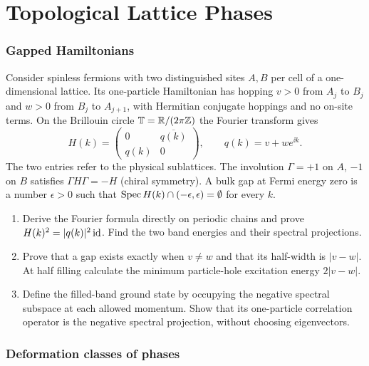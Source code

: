 \part{Topological Lattice Phases}

\section{Gapped Hamiltonians}

\begin{exercise}
Consider spinless fermions with two distinguished sites $A,B$ per
cell of a one-dimensional lattice. Its one-particle Hamiltonian has
hopping $v>0$ from $A_j$ to $B_j$ and $w>0$ from $B_j$ to $A_{j+1}$,
with Hermitian conjugate hoppings and no on-site terms.
On the Brillouin circle $\mathbb T=\mathbb R/(2\pi\mathbb Z)$ the Fourier transform gives
\[
 H(k)=\begin{pmatrix}0&\overline{q(k)}\\q(k)&0\end{pmatrix},
 \qquad q(k)=v+w e^{\ii k}.
\]
The two entries refer to the physical sublattices. The involution
$\Gamma=+1$ on $A$, $-1$ on $B$ satisfies
$\Gamma H\Gamma=-H$ (chiral symmetry).
A bulk gap at Fermi energy zero is a number $\epsilon>0$ such that
$\operatorname{Spec} H(k)\cap(-\epsilon,\epsilon)=\emptyset$ for every $k$.
\begin{enumerate}[label=(\alph*)]
\item Derive the Fourier formula directly on periodic chains and
prove $H(k)^2=|q(k)|^2\operatorname{id}$. Find the two band energies and their
spectral projections.
\item Prove that a gap exists exactly when $v\ne w$ and that its
half-width is $|v-w|$. At half filling calculate the minimum
particle-hole excitation energy $2|v-w|$.
\item Define the filled-band ground state by occupying the negative
spectral subspace at each allowed momentum. Show that its
one-particle correlation operator is the negative spectral
projection, without choosing eigenvectors.
\end{enumerate}
\end{exercise}

\section{Deformation classes of phases}

